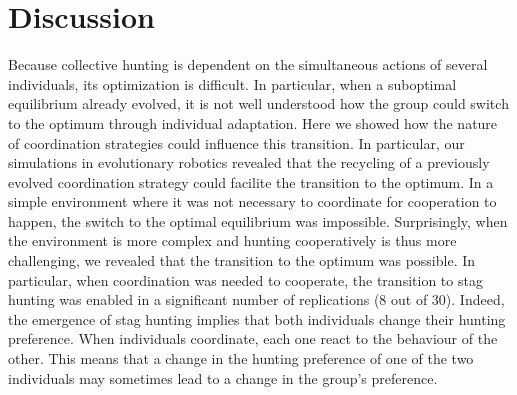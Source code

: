   \section{Discussion}
    Because collective hunting is dependent on the simultaneous actions of several individuals, its optimization is difficult. In particular, when a suboptimal equilibrium already evolved, it is not well understood how the group could switch to the optimum through individual adaptation. Here we showed how the nature of coordination strategies could influence this transition. In particular, our simulations in evolutionary robotics revealed that the recycling of a previously evolved coordination strategy could facilite the transition to the optimum. In a simple environment where it was not necessary to coordinate for cooperation to happen, the switch to the optimal equilibrium was impossible. Surprisingly, when the environment is more complex and hunting cooperatively is thus more challenging, we revealed that the transition to the optimum was possible. In particular, when coordination was needed to cooperate, the transition to stag hunting was enabled in a significant number of replications ($8$ out of $30$). Indeed, the emergence of stag hunting implies that both individuals change their hunting preference. When individuals coordinate, each one react to the behaviour of the other. This means that a change in the hunting preference of one of the two individuals may sometimes lead to a change in the group's preference.

